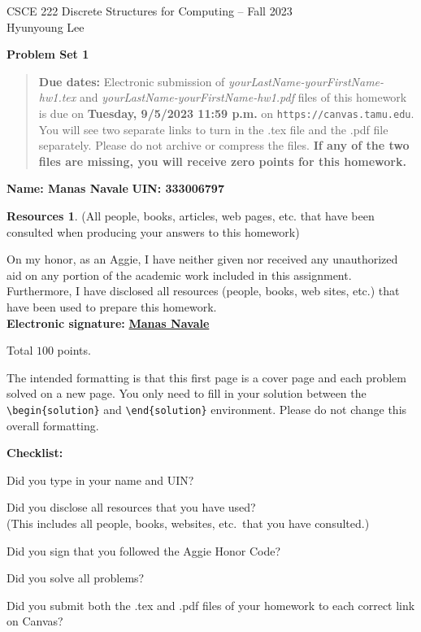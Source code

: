 \documentclass{article}
\theoremstyle{definition}
\newtheorem*{solution}{Solution}
\newtheorem*{resources}{Resources}
\newcommand{\name}[2]{\noindent\textbf{Name: #1}\hfill \textbf{UIN: #2}
  \newcommand{\myName}{#1}
  \newcommand{\myUIN}{#2}
}
\newcommand{\honor}{\noindent On my honor, as an Aggie, I have neither
  given nor received any unauthorized aid on any portion of the
  academic work included in this assignment. Furthermore, I have
  disclosed all resources (people, books, web sites, etc.) that have
  been used to prepare this homework. \\[2ex]
 \textbf{Electronic signature:} \underline{ \textbf{Manas Navale} } } %
\newcommand{\checklist}{\noindent\textbf{Checklist:}
\begin{compactitem}[$\Box$] 
\item Did you type in your name and UIN? 
\item Did you disclose all resources that you have used? \\
(This includes all people, books, websites, etc.\ that you have consulted.)
\item Did you sign that you followed the Aggie Honor Code? 
\item Did you solve all problems? 
\item Did you submit both the .tex and .pdf files of your homework to each correct link on Canvas? 
\end{compactitem}
}
\newcommand{\problemset}[1]{\begin{center}\textbf{Problem Set #1}\end{center}}
\newcommand{\duedate}[1]{\begin{quote}\textbf{Due dates:} Electronic
    submission of \textsl{yourLastName-yourFirstName-hw1.tex} and 
    \textsl{yourLastName-yourFirstName-hw1.pdf} files of this homework is due on
    \textbf{#1} on \texttt{https://canvas.tamu.edu}. You will see two separate links
    to turn in the .tex file and the .pdf file separately. Please do not archive or compress the files.  
    \textbf{If any of the two files are missing, you will receive zero points for this homework.}\end{quote} }
\begin{document}
\begin{center}
{\large
CSCE 222 Discrete Structures for Computing -- Fall 2023\\[.5ex]
Hyunyoung Lee\\}
\end{center}
\problemset{1}
\duedate{Tuesday, 9/5/2023 11:59 p.m.}
\name{ Manas Navale }{ 333006797 }  %

\begin{resources} (All people, books, articles, web pages, etc. that
  have been consulted when producing your answers to this homework)
\end{resources}
\honor

\bigskip

\noindent
Total $100$ points.

\bigskip

\noindent
The intended formatting is that this first page is a cover page and each 
problem solved on a new page. You only need to fill in your solution between 
the \verb|\begin{solution}| and \verb|\end{solution}| environment.  
Please do not change this overall formatting.

\vfill
\checklist
\end{document}

